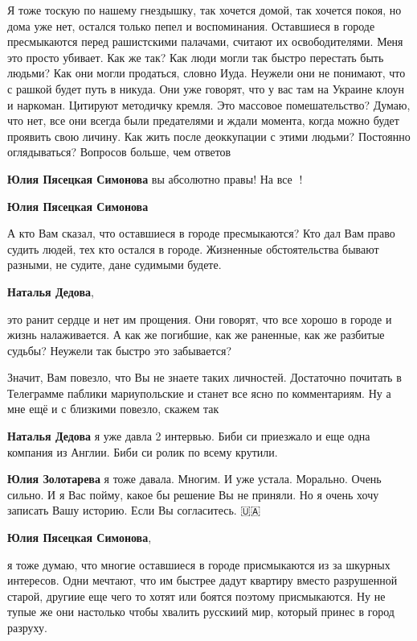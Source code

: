 
Я тоже тоскую по нашему гнездышку, так хочется домой, так хочется покоя, но
дома уже нет, остался только пепел и воспоминания. Оставшиеся в городе
пресмыкаются перед рашистскими палачами, считают их освободителями. Меня это
просто убивает. Как же так? Как люди могли так быстро перестать быть людьми?
Как они могли продаться, словно Иуда. Неужели они не понимают, что с рашкой
будет путь в никуда. Они уже говорят, что у вас там на Украине клоун и
наркоман. Цитируют методичку кремля. Это массовое помешательство? Думаю, что
нет, все они всегда были предателями и ждали момента, когда можно будет
проявить свою личину. Как жить после деоккупации с этими людьми? Постоянно
оглядываться? Вопросов больше, чем ответов

\begin{itemize} %
\textbf{Юлия Пясецкая Симонова} вы абсолютно правы! На все 💯!

\textbf{Юлия Пясецкая Симонова} 

А кто Вам сказал, что оставшиеся в городе пресмыкаются? Кто дал Вам право судить
людей, тех кто остался в городе. Жизненные обстоятельства бывают разными, не
судите, дане судимыми будете.

\textbf{Наталья Дедова}, 

это ранит сердце и нет им прощения. Они говорят, что все хорошо в городе и
жизнь налаживается. А как же погибшие, как же раненные, как же разбитые судьбы?
Неужели так быстро это забывается?


Значит, Вам повезло, что Вы не знаете таких личностей. Достаточно почитать в
Телеграмме паблики мариупольские и станет все ясно по комментариям. Ну а мне
ещё и с близкими повезло, скажем так

\textbf{Наталья Дедова} я уже давла 2 интервью. Биби си приезжало и еще одна компания из Англии. Биби си ролик по всему крутили.

\textbf{Юлия Золотарева} я тоже давала. Многим. И уже устала. Морально. Очень сильно. И я Вас пойму, какое бы решение Вы не приняли. Но я очень хочу записать Вашу историю. Если Вы согласитесь. 🇺🇦

\textbf{Юлия Пясецкая Симонова}, 

я тоже думаю, что многие оставшиеся в городе присмыкаются из за шкурных
интересов. Одни мечтают, что им быстрее дадут квартиру вместо разрушенной
старой, другиие еще чего то хотят или боятся поэтому присмыкаются. Ну не тупые
же они настолько чтобы хвалить русскиий мир, который принес в город разруху.

\end{itemize} %

